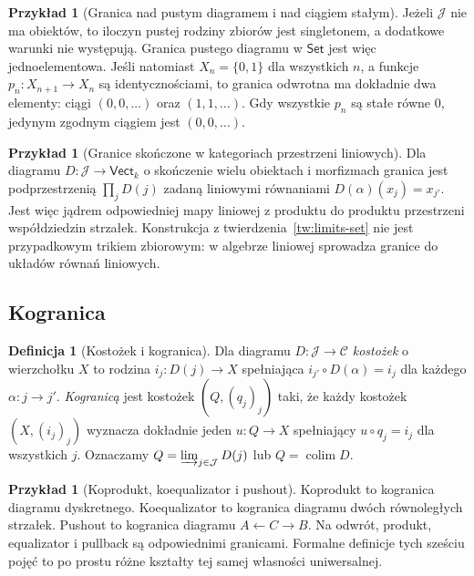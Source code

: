 \documentclass[11pt,a4paper]{article}
\numberwithin{equation}{section}
\theoremstyle{plain}
\theoremstyle{definition}
\newtheorem{definicja}[twierdzenie]{Definicja}
\newtheorem{przyklad}[twierdzenie]{Przykład}
\theoremstyle{remark}
\newcommand{\cat}[1]{\mathsf{#1}}
\newcommand{\Set}{\cat{Set}}
\newcommand{\Vect}{\cat{Vect}}
\newcommand{\colim}{\operatorname{colim}}
\begin{document}
\begin{przyklad}[Granica nad pustym diagramem i nad ciągiem stałym]
Jeżeli $\mathcal J$ nie ma obiektów, to iloczyn pustej rodziny zbiorów jest singletonem, a dodatkowe warunki nie występują. Granica pustego diagramu w $\Set$ jest więc jednoelementowa. Jeśli natomiast $X_n=\{0,1\}$ dla wszystkich $n$, a funkcje $p_n:X_{n+1}\to X_n$ są identycznościami, to granica odwrotna ma dokładnie dwa elementy: ciągi $(0,0,\ldots)$ oraz $(1,1,\ldots)$. Gdy wszystkie $p_n$ są stałe równe $0$, jedynym zgodnym ciągiem jest $(0,0,\ldots)$.
\end{przyklad}

\begin{przyklad}[Granice skończone w kategoriach przestrzeni liniowych]
Dla diagramu $D:\mathcal J\to\Vect_k$ o skończenie wielu obiektach i morfizmach granica jest podprzestrzenią $\prod_jD(j)$ zadaną liniowymi równaniami $D(\alpha)(x_j)=x_{j'}$. Jest więc jądrem odpowiedniej mapy liniowej z produktu do produktu przestrzeni współdziedzin strzałek. Konstrukcja z twierdzenia~\ref{tw:limits-set} nie jest przypadkowym trikiem zbiorowym: w algebrze liniowej sprowadza granice do układów równań liniowych.
\end{przyklad}


\subsection{Kogranica}

\begin{definicja}[Kostożek i kogranica]\label{def:colimit}
Dla diagramu $D:\mathcal J\to\mathcal C$ \emph{kostożek} o wierzchołku $X$ to rodzina $i_j:D(j)\to X$ spełniająca $i_{j'}\circ D(\alpha)=i_j$ dla każdego $\alpha:j\to j'$. \emph{Kogranicą} jest kostożek $(Q,(q_j)_j)$ taki, że każdy kostożek $(X,(i_j)_j)$ wyznacza dokładnie jeden $u:Q\to X$ spełniający $u\circ q_j=i_j$ dla wszystkich $j$. Oznaczamy $Q=\varinjlim_{j\in\mathcal J}D(j)$ lub $Q=\colim D$.
\end{definicja}

\begin{przyklad}[Koprodukt, koequalizator i pushout]
Koprodukt to kogranica diagramu dyskretnego. Koequalizator to kogranica diagramu dwóch równoległych strzałek. Pushout to kogranica diagramu $A\leftarrow C\to B$. Na odwrót, produkt, equalizator i pullback są odpowiednimi granicami. Formalne definicje tych sześciu pojęć to po prostu różne kształty tej samej własności uniwersalnej.
\end{przyklad}
\end{document}
